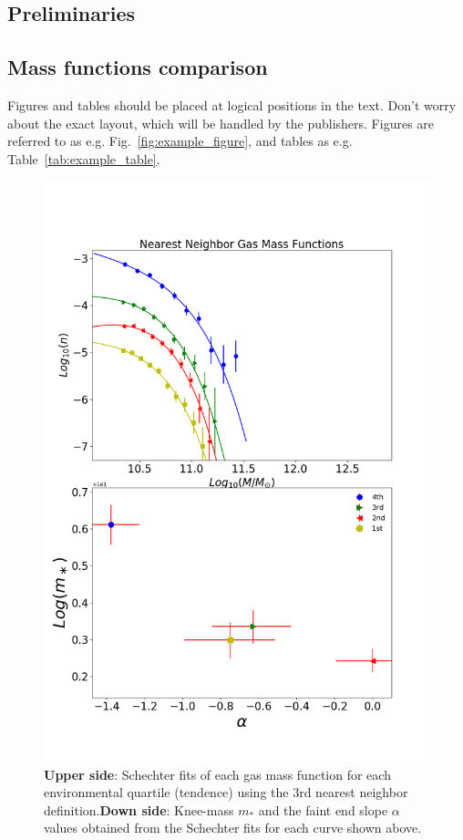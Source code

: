 \documentclass[a4paper,fleqn,usenatbib]{mnras}
\begin{document}
\subsection{Preliminaries}

\subsection{Mass functions comparison}

Figures and tables should be placed at logical positions in the text. Don't
worry about the exact layout, which will be handled by the publishers.
Figures are referred to as e.g. Fig.~\ref{fig:example_figure}, and tables as
e.g. Table~\ref{tab:example_table}.

\begin{figure}
	\includegraphics[width=\columnwidth]{./pics/F19_quartilesGas.png}
    \caption{\textbf{Upper side}: Schechter fits of each gas mass
      function for each environmental quartile (tendence) using the 3rd nearest
      neighbor definition.\textbf{Down side}: Knee-mass $m_\ast$ and
      the faint end slope $\alpha$ values obtained from the Schechter
      fits for each curve shown above.} 
    \label{fig:quartilesGas}
\end{figure}
\end{document}
